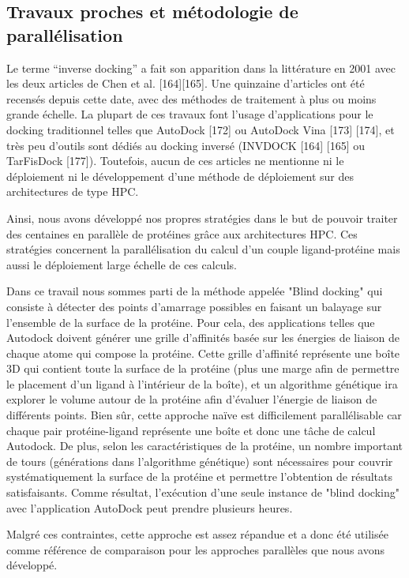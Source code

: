 \subsection{Travaux proches et métodologie de parallélisation}
Le terme “inverse docking” a fait son apparition dans la littérature en 2001 avec les deux articles de Chen et al. [164][165]. Une quinzaine d'articles ont été recensés depuis cette date, avec des méthodes de traitement à plus ou moins grande échelle. La plupart de ces travaux font l'usage d'applications pour le docking traditionnel telles que AutoDock [172] ou AutoDock Vina [173] [174], et très peu d'outils sont dédiés au docking inversé (INVDOCK [164] [165] ou TarFisDock [177]). Toutefois, aucun de ces articles ne mentionne ni le déploiement ni le développement d’une méthode de déploiement sur des architectures de type HPC.

Ainsi, nous avons développé nos propres stratégies dans le but de pouvoir traiter des centaines en parallèle de protéines grâce aux architectures HPC.
Ces stratégies concernent la parallélisation du calcul d'un couple ligand-protéine mais aussi le déploiement large échelle de ces calculs. 

Dans ce travail nous sommes parti de la méthode appelée "Blind docking" qui consiste à détecter des points d'amarrage possibles en faisant un balayage sur l'ensemble de la surface de la protéine. Pour cela, des applications telles que Autodock doivent générer une grille d'affinités basée sur les énergies de liaison de chaque atome qui compose la protéine. Cette grille d'affinité représente une boîte 3D qui contient toute la surface de la protéine (plus une marge afin de permettre le placement d'un ligand à l'intérieur de la boîte),  et un algorithme génétique ira explorer le volume autour de la protéine afin d'évaluer l'énergie de liaison de différents points. Bien sûr, cette approche naïve est difficilement parallélisable car chaque pair protéine-ligand représente une boîte et donc une tâche de calcul Autodock. De plus, selon les caractéristiques de la protéine, un nombre important de tours (générations dans l'algorithme génétique) sont nécessaires pour couvrir systématiquement la surface de la protéine et permettre l'obtention de résultats satisfaisants. Comme résultat, l'exécution d'une seule instance de "blind docking" avec l'application AutoDock peut prendre plusieurs heures.


Malgré ces contraintes, cette approche est assez répandue et a donc été utilisée comme référence de comparaison pour les approches parallèles que nous avons développé.

